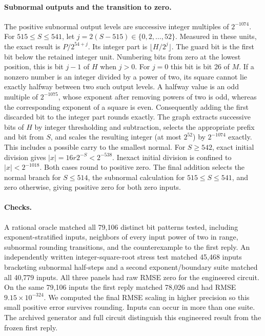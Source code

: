 \paragraph{Subnormal outputs and the transition to zero.}
The positive subnormal output levels are successive integer multiples of $2^{-1074}$. For $515\le S\le541$, let $j=2(S-515)\in\{0,2,\ldots,52\}$. Measured in these units, the exact result is $P/2^{54+j}$.
Its integer part is $\lfloor H/2^j\rfloor$. The guard bit is the first bit below the retained integer unit. Numbering bits from zero at the lowest position, this is bit $j-1$ of $H$ when $j>0$. For $j=0$ this bit is bit 26 of $M$. If a nonzero number is an integer divided by a power of two, its square cannot lie exactly halfway between two such output levels. A halfway value is an odd multiple of $2^{-1075}$, whose exponent after removing powers of two is odd, whereas the corresponding exponent of a square is even. Consequently adding the first discarded bit to the integer part rounds exactly. The graph extracts successive bits of $H$ by integer thresholding and subtraction, selects the appropriate prefix and bit from $S$, and scales the resulting integer (at most $2^{52}$) by $2^{-1074}$ exactly. This includes a possible carry to the smallest normal.
For $S\ge542$, exact initial division gives $|x|=16r2^{-S}<2^{-538}$. Inexact initial division is confined to $|x|<2^{-1018}$. Both cases round to positive zero. The final addition selects the normal branch for $S\le514$, the subnormal calculation for $515\le S\le541$, and zero otherwise, giving positive zero for both zero inputs.

\paragraph{Checks.}
A rational oracle matched all 79,106 distinct bit patterns tested, including exponent-stratified inputs, neighbors of every input power of two in range, subnormal rounding transitions, and the counterexample to the first reply.
An independently written integer-square-root stress test matched 45,468 inputs bracketing subnormal half-steps and a second exponent/boundary suite matched all 40,779 inputs. All three panels had raw RMSE zero for the engineered circuit. On the same 79,106 inputs the first reply matched 78,026 and had RMSE $9.15\times 10^{-324}$. We computed the final RMSE scaling in higher precision so this small positive error survives rounding. Inputs can occur in more than one suite.
The archived generator and full circuit distinguish this engineered result from the frozen first reply.
